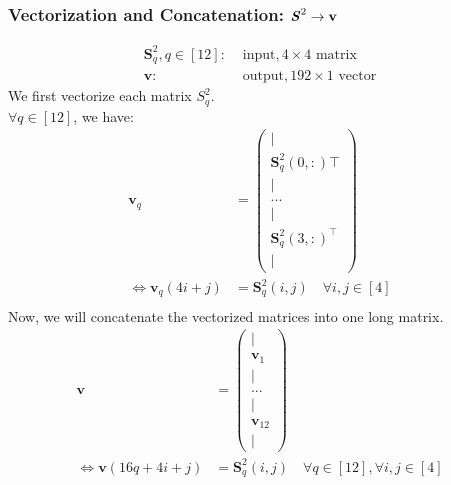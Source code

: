 \documentclass[12pt]{article}
\renewcommand{\vec}[1]{\mathbf{#1}}
\begin{document}
\subsubsection{Vectorization and Concatenation: $\textbf{\textit{S}}^2 \rightarrow \vec{v}$}
\begin{align*}
    \bm{S}^2_q, q \in [12]:& \text{ input}, 4 \times 4 \text{ matrix}\\
    \vec{v}:& \text{ output}, 192 \times 1 \text{ vector}
\end{align*}
We first vectorize each matrix $S^2_q$.\\
$\forall q \in [12]$, we have:
\begin{align*}
    \vec{v}_q &= \begin{pmatrix} | \\ \bm{S}^2_q(0, :)\top \\ | \\ ... \\ | \\ \bm{S}^2_q(3, :)^\top \\ | \end{pmatrix}\\
    \Leftrightarrow \vec{v}_q(4i + j) &= \bm{S}^2_q(i, j) \quad \forall i, j \in [4]\\
\end{align*}
Now, we will concatenate the vectorized matrices into one long matrix.
\begin{align*}
    \vec{v} &= \begin{pmatrix} | \\ \vec{v}_1 \\ | \\ ... \\ | \\ \vec{v}_{12} \\ | \end{pmatrix}\\
    \Leftrightarrow \vec{v}(16q + 4i + j) &= \bm{S}^2_q(i, j) \quad \forall q \in [12], \forall i, j \in [4]
\end{align*}
\end{document}
